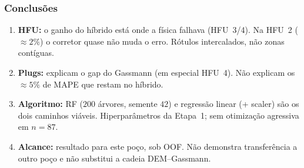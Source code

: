 \documentclass[aspectratio=169,10pt]{beamer}
\begin{document}
\begin{frame}
  \frametitle{Conclusões}
  \footnotesize
  \begin{enumerate}\setlength{\itemsep}{0.20em}
    \item \textbf{HFU:} o ganho do híbrido está onde a física falhava
          (HFU~3/4). Na HFU~2 ($\approx 2\%$) o corretor quase não
          muda o erro. Rótulos intercalados, não zonas contíguas.
    \item \textbf{Plugs:} explicam o gap do Gassmann (em especial
          HFU~4). Não explicam os $\approx 5\%$ de MAPE que restam
          no híbrido.
    \item \textbf{Algoritmo:} RF ($200$ árvores, semente $42$) e
          regressão linear (+ scaler) são os dois caminhos viáveis.
          Hiperparâmetros da Etapa~1; sem otimização agressiva
          em $n=87$.
    \item \textbf{Alcance:} resultado para este poço, sob OOF.
          Não demonstra transferência a outro poço e não substitui
          a cadeia DEM--Gassmann.
  \end{enumerate}
\end{frame}
\end{document}
